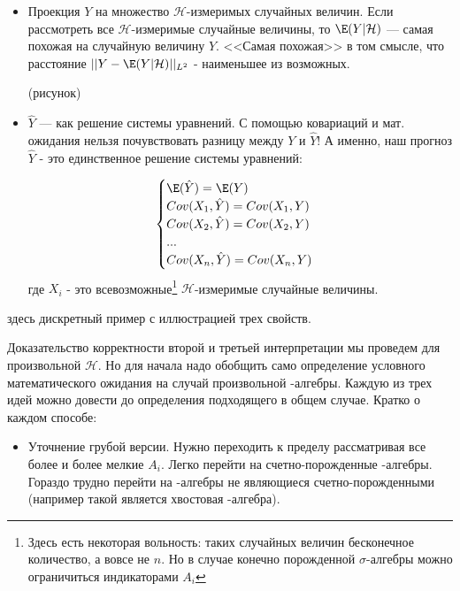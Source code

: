 {\begin{itemize}
\item Проекция $Y$ на множество $\mathcal{H}$-измеримых случайных величин. Если рассмотреть все $\mathcal{H}$-измеримые случайные величины, то $\E(Y|\mathcal{H})$ --- самая похожая на случайную величину $Y$. <<Самая похожая>> в том смысле, что расстояние $||Y-\E(Y|\mathcal{H})||_{L^{2}}$ - наименьшее из возможных. 


(рисунок)
\item $ \hat{Y} $ --- как решение системы уравнений. С помощью ковариаций и мат. ожидания нельзя почувствовать разницу между $Y$ и $\hat{Y}$! А именно, наш прогноз $\hat{Y}$ - это единственное решение системы уравнений:

\begin{equation}
\begin{cases}
\E(\hat{Y})=\E(Y) \\
Cov(X_{1},\hat{Y})=Cov(X_{1},Y) \\
Cov(X_{2},\hat{Y})=Cov(X_{2},Y) \\
... \\
Cov(X_{n},\hat{Y})=Cov(X_{n},Y) \\
\end{cases}
\end{equation}
где $X_{i}$ - это всевозможные\footnote{Здесь есть некоторая вольность: таких случайных величин бесконечное количество, а вовсе не $n$. Но в случае конечно порожденной $ \sigma $-алгебры можно ограничиться индикаторами $ A_{i} $}   $\mathcal{H}$-измеримые случайные величины.

\end{itemize}

\begin{myex}
здесь дискретный пример с иллюстрацией трех свойств.

\end{myex}

Доказательство корректности второй и третьей интерпретации мы проведем для произвольной $\mathcal{H}$. Но для начала надо обобщить само определение условного математического ожидания на случай произвольной \s-алгебры. Каждую из трех идей можно довести до определения подходящего в общем случае. Кратко о каждом способе:

\begin{itemize}

\item Уточнение грубой версии. Нужно переходить к пределу рассматривая все более и более мелкие $A_{i}$. Легко перейти на счетно-порожденные \s-алгебры. Гораздо трудно перейти на \s-алгебры не являющиеся счетно-порожденными (например такой является хвостовая \s-алгебра).


\end{itemize}}
